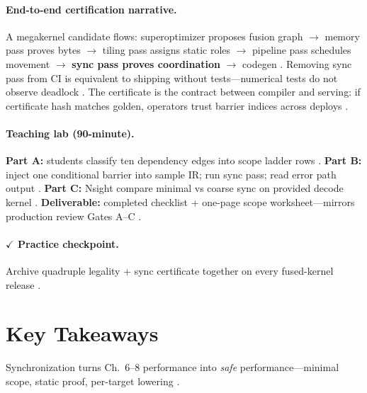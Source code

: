 \paragraph{End-to-end certification narrative.}
A megakernel candidate flows: superoptimizer proposes fusion graph $\rightarrow$ memory pass proves bytes $\rightarrow$ tiling pass assigns static roles $\rightarrow$ pipeline pass schedules movement $\rightarrow$ \textbf{sync pass proves coordination} $\rightarrow$ codegen \citep{wu2024mirage,yirage2026,mpk2025,shah2024flashattention3}.
Removing sync pass from CI is equivalent to shipping without tests---numerical tests do not observe deadlock \citep{taxbreak2026,patel2025llminference}.
The certificate is the contract between compiler and serving: if certificate hash matches golden, operators trust barrier indices across deploys \citep{chen2020compilerbasedhardw,yirage2026}.

\paragraph{Teaching lab (90-minute).}
\textbf{Part A:} students classify ten dependency edges into scope ladder rows \citep{shah2024flashattention3,dlbook}.
\textbf{Part B:} inject one conditional barrier into sample IR; run sync pass; read error path output \citep{yirage2026,chen2020compilerbasedhardw}.
\textbf{Part C:} Nsight compare minimal vs coarse sync on provided decode kernel \citep{patel2025llminference,nvidia2022hopper}.
\textbf{Deliverable:} completed checklist + one-page scope worksheet---mirrors production review Gates A--C \citep{taxbreak2026,mpk2025}.

\paragraph{$\checkmark$ Practice checkpoint.}
Archive quadruple legality + sync certificate together on every fused-kernel release \citep{yirage2026,wu2024mirage,mpk2025,dao2022flashattention,shah2024flashattention3,chen2020compilerbasedhardw,taxbreak2026}.

\section{Key Takeaways}
\label{sec:ch09_key_takeaways}

Synchronization turns Ch.~6--8 performance into \emph{safe} performance---minimal scope, static proof, per-target lowering \citep{yirage2026,shah2024flashattention3,dao2022flashattention,mpk2025}.

